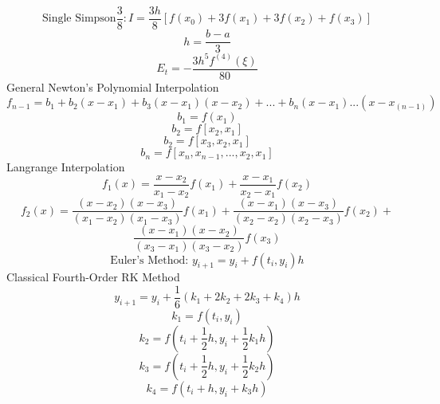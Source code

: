 \documentclass[twocolumn]{article}
\begin{document}
$$\text{Single Simpson}\frac{3}{8}:I = \frac{3h}{8}[f(x_0)  + 3f(x_1) + 3f(x_2) + f(x_3)]$$
	$$h = \frac{b-a}{3}$$
	$$ E_t = -\frac{3h^5 f^{(4)}(\xi)}{80}$$
General Newton's Polynomial Interpolation
	$$f_{n-1} = b_1+b_2(x-x_1)+b_3(x-x_1)(x-x_2)+...+b_n(x-x_1)...(x-x_(n-1))$$
	$$b_1 = f(x_1)$$
	$$b_2 = f[x_2, x_1]$$
	$$b_2 = f[x_3, x_2, x_1]$$
	$$b_n = f[x_n, x_{n-1},...,x_2,x_1]$$
	Langrange Interpolation
	$$f_1(x) = \frac{x-x_2}{x_1-x_2}f(x_1) + \frac{x-x_1}{x_2-x_1}f(x_2)$$
	$$f_2(x) = \frac{(x-x_2)(x-x_3)}{(x_1-x_2)(x_1-x_3)}f(x_1) + \frac{(x-x_1)(x-x_3)}{(x_2-x_2)(x_2-x_3)}f(x_2)+$$ $$\frac{(x-x_1)(x-x_2)}{(x_3-x_1)(x_3-x_2)}f(x_3)$$
	$$\text{Euler's Method: }y_{i+1} = y_i + f(t_i, y_i)h$$
	Classical Fourth-Order RK Method
	$$y_{i+1} = y_i + \frac{1}{6}(k_1+2k_2+2k_3+k_4)h$$
	$$k_1= f(t_i, y_i)$$
	$$k_2= f(t_i+\frac{1}{2}h, y_i+\frac{1}{2}k_1h)$$
	$$k_3= f(t_i+\frac{1}{2}h, y_i+\frac{1}{2}k_2h)$$
	$$k_4= f(t_i+h, y_i+k_3h)$$
\end{document}
